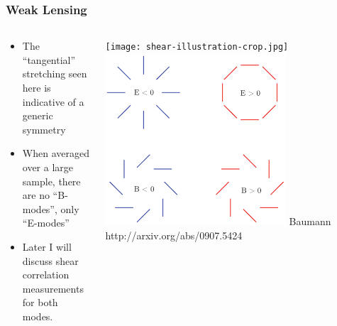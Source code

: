 \documentclass{beamer}
\begin{document}
\frame
{

    \frametitle{Weak Lensing}

    \fontsize{10}{0.8\baselineskip}

    \begin{columns}

        \begin{column}{0.5\textwidth}

            \begin{itemize}

                \item The ``tangential'' stretching seen here is indicative
                of a generic symmetry

                \item When averaged over a large sample, there are no ``B-modes'',
                    only ``E-modes''

                \item Later I will discuss shear correlation measurements for both modes.

            \end{itemize}
        \end{column}
        \begin{column}{0.5\textwidth}
            \begin{center}
                \texttt{[image: shear-illustration-crop.jpg]}
                \newline
                \includegraphics[width=0.7\textwidth]{EBmode.pdf}
                \newline
                {\tiny Baumann http://arxiv.org/abs/0907.5424}
            \end{center}
        \end{column}
    \end{columns}
}
\end{document}
